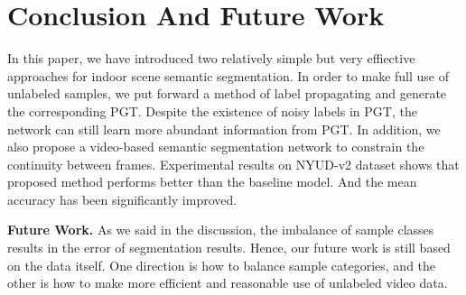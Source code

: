 \section{Conclusion And Future Work}
\label{sec:conclusion}
In this paper, we have introduced two relatively simple but very effiective approaches for indoor scene semantic segmentation.  
%
In order to make full use of unlabeled samples, we put forward a method of label propagating and generate the corresponding PGT.
%
Despite the existence of noisy labels in PGT, the network can still learn more abundant information from PGT.
%
In addition, we also propose a video-based semantic segmentation network to constrain the continuity between frames.
%
Experimental results on NYUD-v2 dataset shows that proposed method performs
better than the baseline model. 
%
And the mean accuracy has been significantly improved.

{\bf Future Work.} As we said in the discussion, the imbalance of sample classes results in the error of segmentation results. 
%
Hence, our future work is still based on the data itself.
%
One direction is how to balance sample categories, and the other is how to make more efficient and reasonable use of unlabeled video data.

